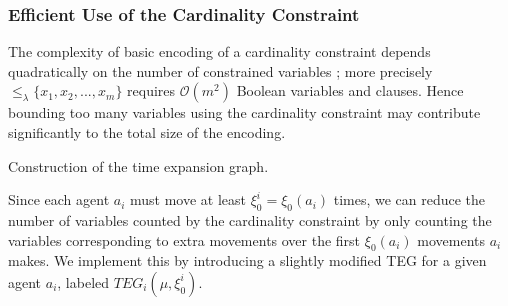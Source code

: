 \documentclass[jair,oneside,11pt]{article}
\begin{document}
\subsubsection{Efficient Use of the Cardinality Constraint}

\noindent The complexity of basic encoding of a cardinality constraint depends quadratically on the number of constrained variables \cite{DBLP:conf/cp/SilvaL07,DBLP:conf/cp/Sinz05}; more precisely $\leq_{\lambda}{\{x_1,x_2,...,x_m\}}$ requires $\mathcal{O}(m^2)$ Boolean variables and clauses. Hence bounding too many variables using the cardinality constraint may contribute significantly to the total size of the encoding.

\begin{algorithm}[t]
\begin{footnotesize}
  \caption{Construction of the time expansion graph.}\label{alg-TEG}
\end{footnotesize}
\end{algorithm}

Since each agent $a_i$ must move at least $\xi^i_0 = \xi_0(a_i)$ times, we can reduce the number of variables counted by the cardinality constraint by only counting the variables corresponding to extra movements over the first  $\xi_0(a_i)$ movements $a_i$ makes. We implement this by introducing a slightly modified TEG for a given agent $a_i$, labeled $TEG_{i}(\mu, \xi^i_0)$.
\end{document}

